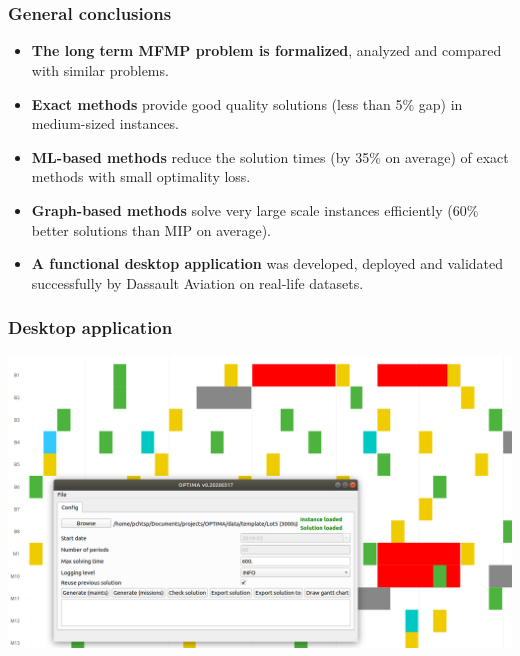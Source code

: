 \section[Conclusions]{\conclusiontitle}

\begin{frame}
\frametitle{\textbf{General conclusions}}
    \begin{itemize}[<+->]
    \item \textbf{The long term MFMP problem is formalized}, 
      analyzed and compared with similar problems.
    \item \textbf{Exact methods}
      provide good quality solutions (less than 5\% gap) in medium-sized instances.
    \item \textbf{ML-based methods}
      reduce the solution times (by 35\% on average) of exact methods with small optimality loss.
    \item \textbf{Graph-based methods}
      solve very large scale instances efficiently (60\% better solutions than MIP on average).
    \item \textbf{A functional desktop application}
       was developed, deployed and validated successfully by Dassault Aviation on real-life datasets.
    \end{itemize}
\end{frame}

\begin{frame}
\frametitle{\textbf{Desktop application}}

  \centering
    \includegraphics[width=0.9\linewidth]{images/gantt_solution_3.png}

\end{frame}

